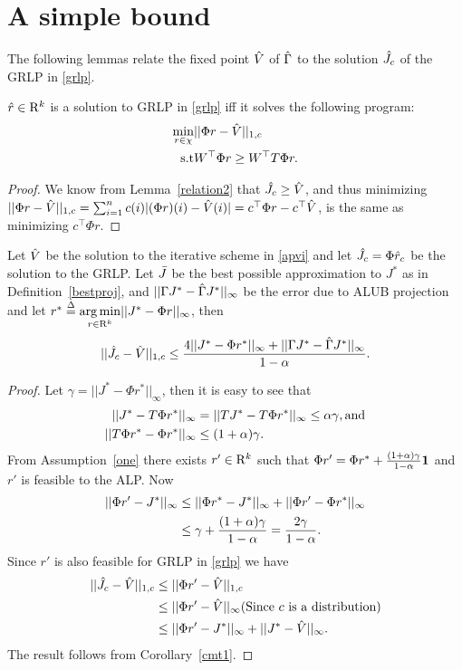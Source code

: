 \section{A simple bound}
The following lemmas relate the fixed point $\hat{V}$ of $\hat{\Gamma}$ to the solution $\hat{J}_c$ of the GRLP in \eqref{grlp}.
\begin{lemma}\label{srw}
$\hat{r} \in \mathrm{R}^k$ is a solution to GRLP in \eqref{grlp} iff it solves the following program:
\begin{align}\label{grlpeqprog}
\min_{r\in \chi} &||\Phi r-\hv||_{1,c}\nn\\
\text{s.t}\mb & W^\top \Phi r\geq W^\top T \Phi r.
\end{align}
\end{lemma}
\begin{proof}
We know from Lemma~\ref{relation2} that $\hat{J}_c\geq\hat{V}$, and thus minimizing $||\Phi r-\hat{V}||_{1,c}=\sum_{i=1}^n c(i) |(\Phi r)(i)-\hat{V}(i)|=c^\top \Phi r-c^\top \hat{V}$, is the same as minimizing $c^\top \Phi r$.
\end{proof}
\begin{theorem}\label{mt2}
Let $\hat{V}$ be the solution to the iterative scheme in \eqref{apvi} and let $\hat{J}_c=\Phi \hat{r}_c$ be the solution to the GRLP. Let $\bar{J}$ be the best possible approximation to $J^*$ as in Definition~\ref{bestproj}, and $||\Gamma J^* -\hat{\Gamma} J^*||_\infty$ be the error due to ALUB projection and let $r^*\stackrel{\Delta}{=}\underset{r\in \mathrm{R}^k}{\arg\min}||J^*-\Phi r||_\infty$, then
\begin{align}
||\hat{J}_c-\hat{V}||_{1,c}\leq\frac{4||J^*-\Phi r^*||_\infty+||\Gamma J^*-\hat{\Gamma} J^*||_\infty}{1-\alpha}.
\end{align}
\end{theorem}
\begin{proof}
Let $\gamma=||J^*-\Phi r^*||_\infty$, then  it is easy to see that
\begin{align}
||J^*-T\Phi r^*||_\infty&=||TJ^*-T\Phi r^*||_\infty\leq\alpha\gamma,\mb\text{and}\nn\\\vspace{10pt}
||T\Phi r^*-\Phi r^*||_\infty&\leq(1+\alpha)\gamma.
\end{align}
From Assumption~\ref{one} there exists $r'\in \mathrm{R}^k$ such that $\Phi r'=\Phi r^*+\frac{(1+\alpha)\gamma}{1-\alpha}\mathbf{1}$ and $r'$ is feasible to the ALP. Now
\begin{align}
||\Phi r'-J^*||_\infty&\leq ||\Phi r^* -J^*||_\infty+||\Phi r'-\Phi r^*||_\infty\nonumber\\&\leq \gamma+\frac{(1+\alpha)\gamma}{1-\alpha}=\frac{2\gamma}{1-\alpha}.
\end{align}
Since $r'$ is also feasible for GRLP in \eqref{grlp} we have
\begin{align}
||\hj-\hv||_{1,c}&\leq||\Phi r'-\hv||_{1,c}\nn\\\vspace{10pt}
&\leq||\Phi r'-\hv||_\infty\mb\text{(Since $c$ is a distribution)}\nn\\
&\leq||\Phi r'-J^*||_\infty+||J^*-\hv||_\infty.\nn
\end{align}
The result follows from Corollary~\ref{cmt1}.
\end{proof}\\
